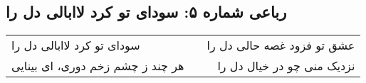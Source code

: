 \begin{center}
\section*{رباعی شماره ۵: سودای تو کرد لاابالی دل را}
\label{sec:005}
\begin{longtable}{l p{0.5cm} r}
سودای تو کرد لاابالی دل را
&&
عشق تو فزود غصه حالی دل را
\\
هر چند ز چشم زخم دوری، ای بینایی
&&
نزدیک منی چو در خیال دل را
\\
\end{longtable}
\end{center}
